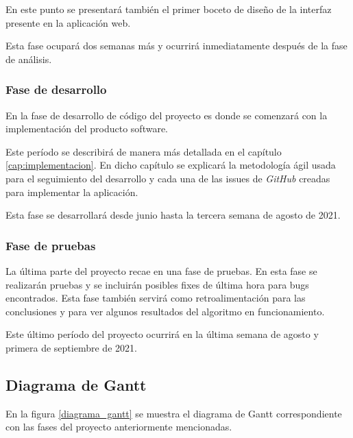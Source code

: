 En este punto se presentará también el primer boceto de diseño de la interfaz presente en la aplicación web. \newline

Esta fase ocupará dos semanas más y ocurrirá inmediatamente después de la fase de análisis.

\subsubsection{Fase de desarrollo}

En la fase de desarrollo de código del proyecto es donde se comenzará con la implementación del producto software. \newline

Este período se describirá de manera más detallada en el capítulo \ref{cap:implementacion}. En dicho capítulo se explicará la metodología ágil usada para el seguimiento del desarrollo y cada una de las issues de \textit{GitHub} creadas para implementar la aplicación. \newline

Esta fase se desarrollará desde junio hasta la tercera semana de agosto de 2021.

\subsubsection{Fase de pruebas}

La última parte del proyecto recae en una fase de pruebas. En esta fase se realizarán pruebas y se incluirán posibles fixes de última hora para bugs encontrados. Esta fase también servirá como retroalimentación para las conclusiones y para ver algunos resultados del algoritmo en funcionamiento. \newline


Este último período del proyecto ocurrirá en la última semana de agosto y primera de septiembre de 2021.

\subsection{Diagrama de Gantt}

En la figura \ref{diagrama_gantt} se muestra el diagrama de Gantt correspondiente con las fases del proyecto anteriormente mencionadas. \newline


